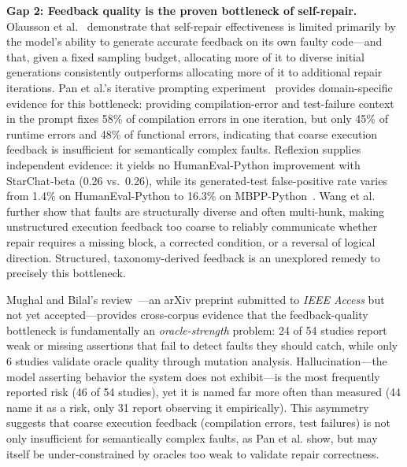 \documentclass[10pt,a4paper]{article}
\begin{document}
\textbf{Gap 2: Feedback quality is the proven bottleneck of self-repair.} Olausson et al.~\cite{olausson2024} demonstrate that self-repair effectiveness is limited primarily by the model's ability to generate accurate feedback on its own faulty code---and that, given a fixed sampling budget, allocating more of it to diverse initial generations consistently outperforms allocating more of it to additional repair iterations. Pan et al.'s iterative prompting experiment~\cite{pan2024lost} provides domain-specific evidence for this bottleneck: providing compilation-error and test-failure context in the prompt fixes 58\% of compilation errors in one iteration, but only 45\% of runtime errors and 48\% of functional errors, indicating that coarse execution feedback is insufficient for semantically complex faults. Reflexion supplies independent evidence: it yields no HumanEval-Python improvement with StarChat-beta (0.26 vs.\ 0.26), while its generated-test false-positive rate varies from 1.4\% on HumanEval-Python to 16.3\% on MBPP-Python~\cite{shinn2023}. Wang et al.~\cite{wang2025where} further show that faults are structurally diverse and often multi-hunk, making unstructured execution feedback too coarse to reliably communicate whether repair requires a missing block, a corrected condition, or a reversal of logical direction. Structured, taxonomy-derived feedback is an unexplored remedy to precisely this bottleneck.

Mughal and Bilal's review~\cite{mughal2026oracle}---an arXiv preprint submitted to \textit{IEEE Access} but not yet accepted---provides cross-corpus evidence that the feedback-quality bottleneck is fundamentally an \textit{oracle-strength} problem: 24 of 54 studies report weak or missing assertions that fail to detect faults they should catch, while only 6 studies validate oracle quality through mutation analysis. Hallucination---the model asserting behavior the system does not exhibit---is the most frequently reported risk (46 of 54 studies), yet it is named far more often than measured (44 name it as a risk, only 31 report observing it empirically). This asymmetry suggests that coarse execution feedback (compilation errors, test failures) is not only insufficient for semantically complex faults, as Pan et al. show, but may itself be under-constrained by oracles too weak to validate repair correctness.
\end{document}
